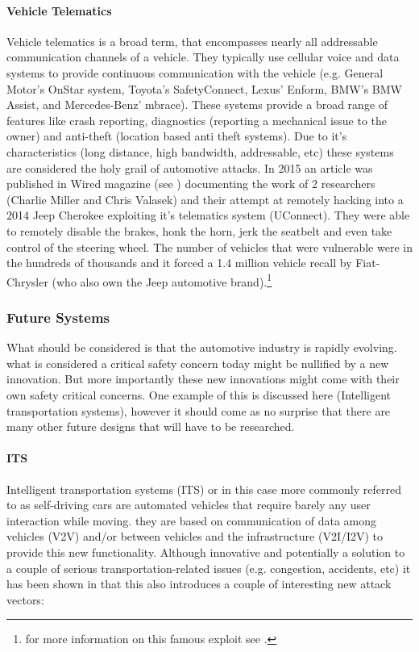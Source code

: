 \documentclass[11pt]{article}
\begin{document}
\paragraph{Vehicle Telematics} Vehicle telematics is a broad term, that encompasses nearly all addressable communication channels of a vehicle. They typically use cellular voice and data systems to provide continuous communication with the vehicle (e.g. General Motor's OnStar system, Toyota’s SafetyConnect, Lexus’ Enform, BMW’s BMW Assist, and Mercedes-Benz’ mbrace). These systems provide a broad range of features like crash reporting, diagnostics (reporting a mechanical issue to the owner) and anti-theft (location based anti theft systems)\cite{Kosher}. Due to it's characteristics (long distance, high bandwidth, addressable, etc) these systems are considered the holy grail of automotive attacks\cite{MillerA}. In 2015 an article was published in Wired magazine (see \cite{Wired}) documenting the work of 2 researchers (Charlie Miller and Chris Valasek) and their attempt at remotely hacking into a 2014 Jeep Cherokee exploiting it's telematics system (UConnect). They were able to remotely disable the brakes, honk the horn, jerk the seatbelt and even take control of the steering wheel\cite{Wired}. The number of vehicles that were vulnerable were in the hundreds of thousands and it forced a 1.4 million vehicle recall by Fiat-Chrysler (who also own the Jeep automotive brand).\footnote{for more information on this famous exploit see \cite{MillerD}.}

\subsubsection{Future Systems}
What should be considered is that the automotive industry is rapidly evolving. what is considered a critical safety concern today might be nullified by a new innovation. But more importantly these new innovations might come with their own safety critical concerns. One example of this is discussed here (Intelligent transportation systems), however it should come as no surprise that there are many other future designs that will have to be researched.

\paragraph{ITS} Intelligent transportation systems (ITS) or in this case more commonly referred to as self-driving cars are automated vehicles that require barely any user interaction while moving. they are based on communication of data among vehicles (V2V) and/or between vehicles and the infrastructure (V2I/I2V) to provide this new functionality. Although innovative and potentially a solution to a couple of serious transportation-related issues (e.g. congestion, accidents, etc) it has been shown in \cite{Petit} that this also introduces a couple of interesting new attack vectors:   
\end{document}
